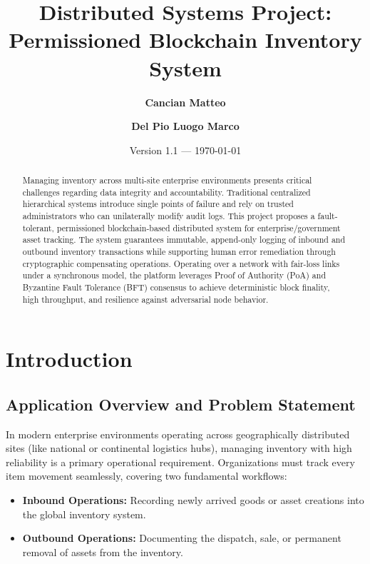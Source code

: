 \documentclass[11pt, a4paper, oneside]{memoir}
\title{\textbf{Distributed Systems Project: \\ Permissioned Blockchain Inventory System}}
\author{\textbf{Cancian Matteo} \quad \and \quad \textbf{Del Pio Luogo Marco}}
\date{Version 1.1 --- \today}
\begin{document}
\maketitle

\begin{abstract}
Managing inventory across multi-site enterprise environments presents critical challenges regarding data integrity and accountability. 
Traditional centralized hierarchical systems introduce single points of failure and rely on trusted administrators who can unilaterally modify audit logs. 
This project \cite{project-repo} proposes a fault-tolerant, permissioned blockchain-based distributed system for enterprise/government asset tracking. The system guarantees immutable, append-only logging of inbound and outbound inventory transactions while supporting human error remediation through cryptographic compensating operations.
Operating over a network with fair-loss links under a synchronous model, the platform leverages Proof of Authority (PoA) and Byzantine Fault Tolerance (BFT) consensus to achieve deterministic block finality, high throughput, and resilience against adversarial node behavior.
\end{abstract}

\clearpage

\tableofcontents

\chapter{Introduction}\label{ch:intro}

\section{Application Overview and Problem Statement}
In modern enterprise environments operating across geographically distributed sites (like national or continental logistics hubs), managing inventory with high reliability is a primary operational requirement. 
Organizations must track every item movement seamlessly, covering two fundamental workflows:
\begin{itemize}
    \item \textbf{Inbound Operations:} Recording newly arrived goods or asset creations into the global inventory system.
    \item \textbf{Outbound Operations:} Documenting the dispatch, sale, or permanent removal of assets from the inventory.
\end{itemize}
\end{document}
